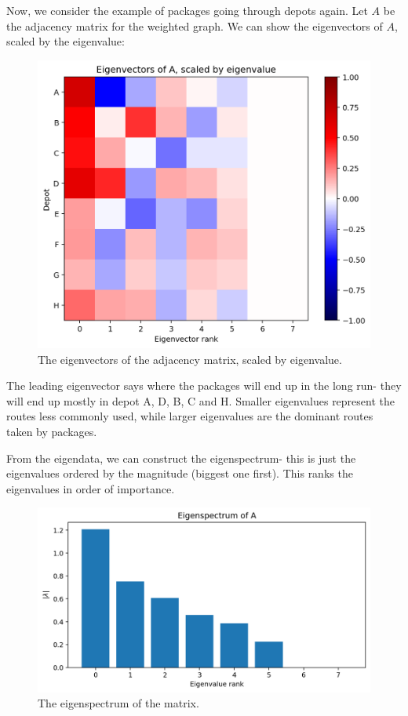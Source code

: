 \documentclass[a4paper, openany]{memoir}
\begin{document}
    Now, we consider the example of packages going through depots again. Let $A$ be the adjacency matrix for the weighted graph. We can show the eigenvectors of $A$, scaled by the eigenvalue:
    \begin{figure}[H]
        \centering
        \includegraphics[scale=0.4]{src/3.27 Eigenvectors scaled by eigenvalue.png}
        \caption{The eigenvectors of the adjacency matrix, scaled by eigenvalue.}
    \end{figure}
    The leading eigenvector says where the packages will end up in the long run- they will end up mostly in depot A, D, B, C and H. Smaller eigenvalues represent the routes less commonly used, while larger eigenvalues are the dominant routes taken by packages.

    From the eigendata, we can construct the eigenspectrum- this is just the eigenvalues ordered by the magnitude (biggest one first). This ranks the eigenvalues in order of importance.
    \begin{figure}[H]
        \centering
        \includegraphics[scale=0.4]{src/3.28 Eigenspectrum.png}
        \caption{The eigenspectrum of the matrix.}
    \end{figure}
    
\end{document}
